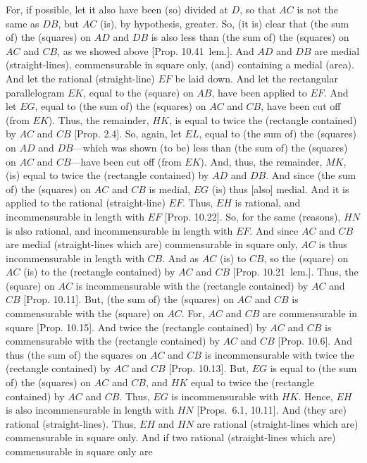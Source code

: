 \begin{Parallel}{}{}
{For, if possible, let it also have  been (so) divided at $D$, so that $AC$ is not the
same as $DB$, but $AC$ (is), by hypothesis, greater. So, (it is)  clear that
(the sum of) the (squares) on $AD$ and $DB$ is also less than (the sum of)
the (squares) on $AC$ and $CB$, as we showed above [Prop. 10.41~lem.].  And $AD$ and $DB$ are medial (straight-lines), commensurable in square only, (and)
containing a medial (area). And let the rational (straight-line) $EF$
be laid down. And let the rectangular parallelogram $EK$, equal to the (square) on $AB$, have been applied to $EF$. And let $EG$, equal to
(the sum of) the (squares) on $AC$ and $CB$, have been cut  off (from $EK$).
Thus, the remainder, $HK$, is equal to twice the (rectangle contained)
by $AC$ and $CB$ [Prop. 2.4]. So, again,
let $EL$, equal to  (the sum of) the (squares) on  $AD$ and $DB$---which was shown (to be) less than (the sum of) the (squares) on $AC$ and
$CB$---have been cut off (from $EK$). And, thus, the remainder, $MK$,
(is) equal to twice the (rectangle contained) by $AD$ and $DB$. 
And since (the sum of) the (squares) on $AC$ and $CB$ is medial, $EG$ (is) thus [also]
medial. And it is applied to the rational (straight-line) $EF$. Thus, $EH$
is rational, and incommensurable in length with $EF$ [Prop. 10.22]. So, for the same (reasons), $HN$
is also rational, and incommensurable in length with $EF$. And since 
$AC$ and $CB$  are medial (straight-lines which are) commensurable
in square only, $AC$ is thus incommensurable in length with $CB$.
And as $AC$ (is) to $CB$, so the (square) on $AC$ (is) to the
(rectangle contained) by $AC$ and $CB$ [Prop. 10.21~lem.]. Thus, the (square) on $AC$ is
incommensurable with the (rectangle contained) by $AC$ and $CB$
[Prop. 10.11]. But, (the sum of) the (squares)
on $AC$ and $CB$ is commensurable with the (square) on $AC$.
For, $AC$ and $CB$ are commensurable in square [Prop. 10.15]. And
twice the (rectangle contained) by $AC$ and $CB$ is commensurable with the (rectangle contained) by $AC$ and $CB$ [Prop. 10.6]. And thus
(the sum of) the squares on $AC$ and $CB$ is incommensurable with twice
the (rectangle contained) by $AC$ and $CB$ [Prop. 10.13]. But, $EG$ is equal to (the sum
of) the (squares) on $AC$ and $CB$, and $HK$ equal to twice the (rectangle
contained) by $AC$ and $CB$. Thus, $EG$ is incommensurable
with $HK$. Hence, $EH$ is also incommensurable in length with  $HN$
[Props.~6.1, 10.11].
And (they are)  rational (straight-lines). Thus, $EH$ and $HN$ are rational
(straight-lines which are) commensurable in square only. And if two
rational (straight-lines which are) commensurable in square only are
}
\end{Parallel}
